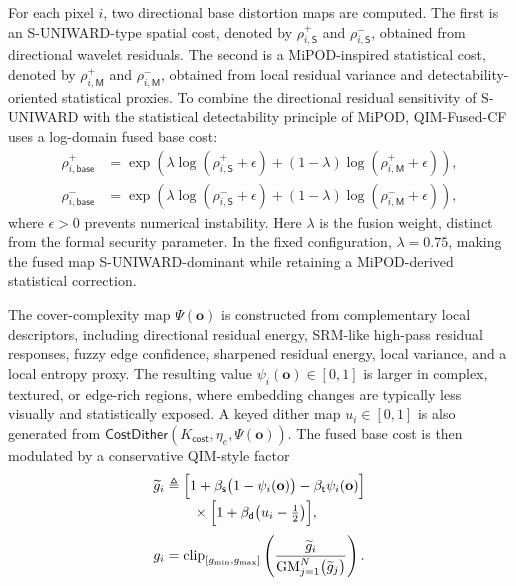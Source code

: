 \documentclass[journal]{IEEEtran}
\theoremstyle{definition}
\theoremstyle{game}
\begin{document}
For each pixel $i$, two directional base distortion maps are computed. The first is an S-UNIWARD-type spatial cost, denoted by $\rho_{i,\mathsf{S}}^{+}$ and $\rho_{i,\mathsf{S}}^{-}$, obtained from directional wavelet residuals. The second is a MiPOD-inspired statistical cost, denoted by $\rho_{i,\mathsf{M}}^{+}$ and $\rho_{i,\mathsf{M}}^{-}$, obtained from local residual variance and detectability-oriented statistical proxies. To combine the directional residual sensitivity of S-UNIWARD with the statistical detectability principle of MiPOD, QIM-Fused-CF uses a log-domain fused base cost:
\begin{align}
    \rho_{i,\mathsf{base}}^{+}
    &=
    \exp\!\left(
    \lambda \log(\rho_{i,\mathsf{S}}^{+}+\epsilon)
    +(1-\lambda)\log(\rho_{i,\mathsf{M}}^{+}+\epsilon)
    \right),
    \label{eq:qim_base_cost_plus}
    \\
    \rho_{i,\mathsf{base}}^{-}
    &=
    \exp\!\left(
    \lambda \log(\rho_{i,\mathsf{S}}^{-}+\epsilon)
    +(1-\lambda)\log(\rho_{i,\mathsf{M}}^{-}+\epsilon)
    \right),
    \label{eq:qim_base_cost_minus}
\end{align}
where $\epsilon>0$ prevents numerical instability. Here $\lambda$ is the fusion weight, distinct from the formal security
parameter. In the fixed configuration, $\lambda=0.75$, making the fused map S-UNIWARD-dominant while retaining a MiPOD-derived statistical correction.

The cover-complexity map $\Psi(\mathbf{o})$ is constructed from complementary local descriptors, including directional residual energy, SRM-like high-pass residual responses, fuzzy edge confidence, sharpened residual energy, local variance, and a local entropy proxy. The resulting value $\psi_i(\mathbf{o})\in[0,1]$ is larger in complex, textured, or edge-rich regions, where embedding changes are typically less visually and statistically exposed. A keyed dither map $u_i\in[0,1]$ is also generated from $\mathsf{CostDither}(K_{\mathsf{cost}},\eta_e,\Psi(\mathbf{o}))$. The fused base cost is then modulated by a conservative QIM-style factor
\begin{equation}
\begin{aligned}
\widetilde{g}_i
&\triangleq
\Bigl[
  1+\beta_{\mathsf{s}}\bigl(1-\psi_i(\mathbf{o})\bigr)
  -\beta_{\mathsf{t}}\psi_i(\mathbf{o})
\Bigr]
\\[-1mm]
&\qquad{}\times
\Bigl[
  1+\beta_{\mathsf{d}}
  \bigl(u_i-\tfrac{1}{2}\bigr)
\Bigr],
\\[1mm]
g_i
&=
\operatorname{clip}_{[g_{\min},g_{\max}]}
\left(
\frac{\widetilde{g}_i}
     {\operatorname{GM}_{j=1}^{N}
      \bigl(\widetilde{g}_j\bigr)}
\right).
\end{aligned}
\label{eq:qim_modulation_factor}
\end{equation}
\end{document}
